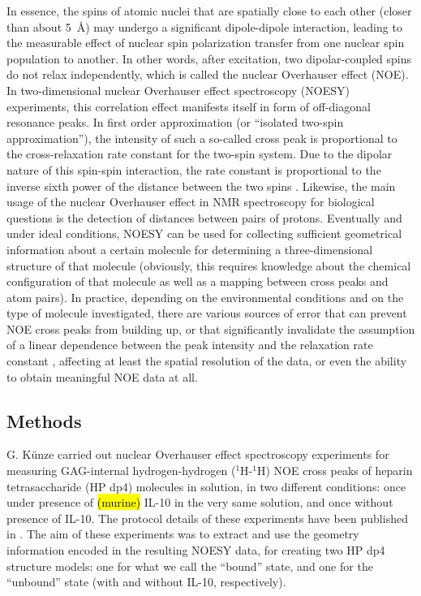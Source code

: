 In essence, the spins of atomic nuclei that are spatially close to each other
(closer than about \SI{5}{\angstrom}) may undergo a significant dipole-dipole
interaction, leading to the measurable effect of nuclear spin polarization
transfer from one nuclear spin population to another. In other words, after
excitation, two dipolar-coupled spins do not relax independently, which is
called the nuclear Overhauser effect (NOE). In two-dimensional nuclear
Overhauser effect spectroscopy (NOESY) experiments, this correlation effect
manifests itself in form of off-diagonal resonance peaks. In first order
approximation (or \enquote{isolated two-spin approximation}), the intensity of
such a so-called cross peak is proportional to the cross-relaxation rate
constant for the two-spin system. Due to the dipolar nature of this spin-spin
interaction, the rate constant is proportional to the inverse sixth power of
the distance between the two spins \cite{neuhaus2000_noe}. Likewise, the main
usage of the nuclear Overhauser effect in NMR spectroscopy for biological
questions is the detection of distances between pairs of protons. Eventually and
under ideal conditions, NOESY can be used for collecting sufficient geometrical
information about a certain molecule for determining a three-dimensional
structure of that molecule (obviously, this requires knowledge about the
chemical configuration of that molecule as well as a mapping between cross peaks
and atom pairs). In practice, depending on the environmental conditions and on
the type of molecule investigated, there are various sources of error that can
prevent NOE cross peaks from building up, or that significantly invalidate the
assumption of a linear dependence between the peak intensity and the relaxation
rate constant \cite{palmer_online_nmr_relaxation}, affecting at least the
spatial resolution of the data, or even the ability to obtain meaningful NOE
data at all.


\subsection{Methods} G. Künze carried out nuclear Overhauser effect spectroscopy
experiments for measuring GAG-internal hydrogen-hydrogen (${}^1$H-${}^1$H) NOE
cross peaks of heparin tetrasaccharide (HP dp4) molecules in solution, in two
different conditions: once under presence of \hl{(murine)} IL-10 in the very
same solution, and once without presence of IL-10. The protocol details of these
experiments have been published in \cite{kuenze_gehrcke_2014}. The aim of these
experiments was to extract and use the geometry information encoded in the
resulting NOESY data, for creating two HP dp4 structure models: one for what we
call the \enquote{bound} state, and one for the \enquote{unbound} state (with
and without IL-10, respectively).

